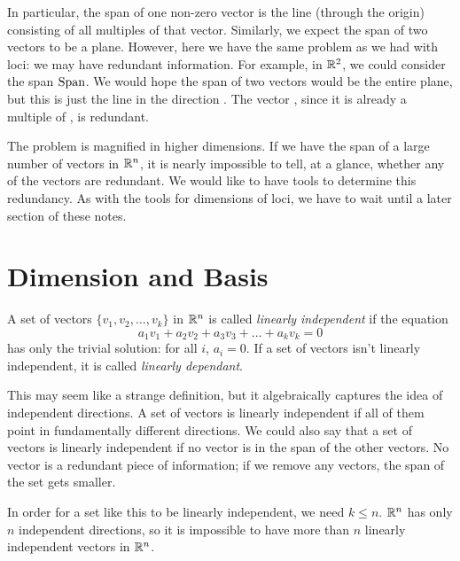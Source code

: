 \documentclass[fleqn]{report}
\begin{document}
In particular, the span of one non-zero vector is the line
(through the origin) consisting of all multiples of that
vector. Similarly, we expect the span of two
vectors to be a plane. However, here we have the
same problem as we had with loci: we may have redundant
information. For example, in $\mathbb{R}^2$, we could consider the
span $\mathrm{Span}$. We would hope the span of two
vectors would be the entire plane, but this is just the line in the
direction . The vector
, since it is already a multiple
of , is redundant.

The problem is magnified in higher dimensions. If we
have the span of a large number of vectors in $\mathbb{R}^n$, it is
nearly impossible to tell, at a glance, whether any of the
vectors are redundant. We would like to have tools to determine
this redundancy. As with the tools for dimensions of loci, we
have to wait until a later section of these notes.

\section{Dimension and Basis}

\begin{defn}
A set of vectors $\{v_1, v_2, \ldots, v_k\}$ in $\mathbb{R}^n$ is
called \emph{linearly independent} if the equation
\begin{equation*}
a_1 v_1 + a_2 v_2 + a_3 v_3 + \ldots + a_k v_k = 0
\end{equation*}
has only the trivial solution: for all $i$, $a_i = 0$. If a set of
vectors isn't linearly independent, it is called \emph{linearly
dependant}.
\end{defn}

This may seem like a strange definition, but it
algebraically captures the idea of independent directions. A
set of vectors is linearly independent if all of them point in
fundamentally different directions. We could also say that a
set of vectors is linearly independent if no vector is in the
span of the other vectors. No vector is a
redundant piece of information; if we remove any vectors, the
span of the set gets smaller.

In order for a set like this to be linearly independent, we need
$k \leq n$. $\mathbb{R}^n$ has only $n$ independent directions, so it
is impossible to have more than $n$ linearly
independent vectors in $\mathbb{R}^n$. 
\end{document}
